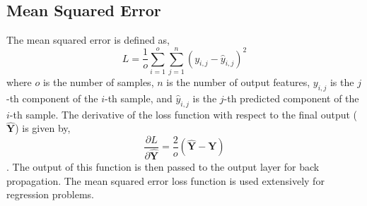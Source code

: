 \documentclass[11pt]{article}
\theoremstyle{definition}
\begin{document}
\subsection{Mean Squared Error}
The mean squared error is defined as,
\begin{equation}
    L = \frac{1}{o} \sum_{i=1}^{o} \sum_{j=1}^{n} (y_{i,j} - \hat{y}_{i,j})^2
\end{equation}
where $o$ is the number of samples, $n$ is the number of output features, $y_{i,j}$ is 
the $j$-th component of the $i$-th sample, and $\hat{y}_{i,j}$ is the $j$-th predicted 
component of the $i$-th sample. The derivative of the loss function with respect to the 
final output ($\mathbf{\hat{Y}}$) is given by,
\begin{equation}
    \frac{\partial L}{\partial \mathbf{\hat{Y}}} = \frac{2}{o} (\mathbf{\hat{Y}} - \mathbf{Y})
\end{equation}
. The output of this function is then passed to the output layer for back propagation.
The mean squared error loss function is used extensively for regression problems.
\end{document}
